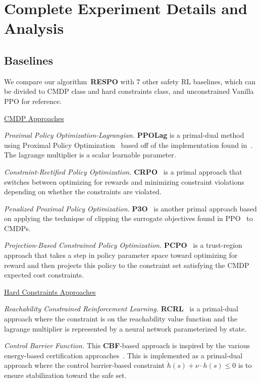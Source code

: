 \documentclass{article}
\theoremstyle{definition}
\begin{document}
\section{Complete Experiment Details and Analysis}

\subsection{Baselines}
We compare our algorithm~\textbf{RESPO} with $7$ other safety RL baselines, which can be divided to CMDP class and hard constraints class, and unconstrained Vanilla PPO for reference.

\underline{CMDP Approaches}

\emph{Proximal Policy Optimization-Lagrangian.} \textbf{PPOLag} is a primal-dual method using Proximal Policy Optimization~\cite{PPO} based off of the implementation found in~\cite{tessler}. The lagrange multiplier is a scalar learnable parameter.

\emph{Constraint-Rectified Policy Optimization.} \textbf{CRPO}~\cite{xu2021crpo} is a primal approach that switches between optimizing for rewards and minimizing constraint violations depending on whether the constraints are violated.

\emph{Penalized Proximal Policy Optimization.} \textbf{P3O}~\cite{Zhang2022PenalizedPP} is another primal approach based on applying the technique of clipping the surrogate objectives found in PPO~\cite{PPO} to CMDPs.

\emph{Projection-Based Constrained Policy Optimization.} \textbf{PCPO}~\cite{YangProj} is a trust-region approach that takes a step in policy parameter space toward optimizing for reward and then projects this policy to the constraint set satisfying the CMDP expected cost constraints.

\underline{Hard Constraints Approaches}

\emph{Reachability Constrained Reinforcement Learning.} \textbf{RCRL}~\cite{yu2022reachability} is a primal-dual approach where the constraint is on the reachability value function and the lagrange multiplier is represented by a neural network parameterized by state.

\emph{Control Barrier Function.} This \textbf{CBF}-based approach is inspired by the various energy-based certification approaches~\cite{dawson2023safe, Chang2021,qin2022quantifying,cbfsurvey,choi2021robust,pocarEYY}. This is implemented as a primal-dual approach where the control barrier-based constraint $\dot{h}(s) + \nu\cdot h(s)\leq 0$ is to ensure stabilization toward the safe set.
\end{document}
